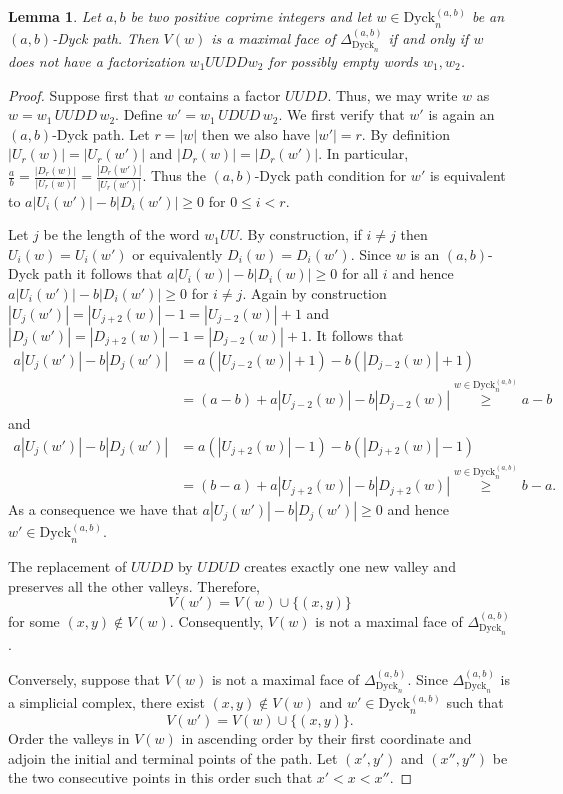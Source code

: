 \documentclass[11pt]{amsart}
\def\Dyck{\mathrm{Dyck}}
\theoremstyle{plain}
\newtheorem{lemma}{Lemma}
\numberwithin{lemma}{\DefaultNumberTheoremWithin}
\numberwithin{theorem}{\DefaultNumberTheoremWithin}
\numberwithin{corollary}{\DefaultNumberTheoremWithin}
\numberwithin{proposition}{\DefaultNumberTheoremWithin}
\numberwithin{conjecture}{\DefaultNumberTheoremWithin}
\theoremstyle{definition}
\numberwithin{definition}{\DefaultNumberTheoremWithin}
\numberwithin{question}{\DefaultNumberTheoremWithin}
\numberwithin{problem}{\DefaultNumberTheoremWithin}
\theoremstyle{remark}
\numberwithin{remark}{\DefaultNumberTheoremWithin}
\numberwithin{example}{\DefaultNumberTheoremWithin}
\numberwithin{claim}{\DefaultNumberTheoremWithin}
\begin{document}
\begin{lemma} \label{lem:max}
  Let $a,b$ be two positive coprime integers and let $w \in \Dyck_n^{(a,b)}$ be an $(a,b)$-Dyck path. Then $V(w)$ is a maximal face
  of $\Delta_{\Dyck_n}^{(a,b)}$ if and only if $w$ does not 
  have a factorization $w_1UUDDw_2$ for possibly empty
  words $w_1,w_2$. 
\end{lemma}

\begin{proof} 
Suppose first that $w$ contains a factor $UUDD$. 
Thus, we may write $w$ as $w=w_1\,UUDD\,w_2.$ Define $w'=w_1\,UDUD\,w_2.$  We first verify that $w'$ is again an $(a,b)$-Dyck path. Let $r = |w|$ then we also have $|w'| = r$. By definition 
$|U_r(w)| = |U_r(w')|$ and $|D_r(w)| = |D_r(w')|$. In particular, $\frac{a}{b} = \frac{|D_r(w)|}{|U_r(w)|} = \frac{|D_r(w')|}{|U_r(w')|}$. 
Thus the $(a,b)$-Dyck path condition for $w'$ is equivalent to $a|U_i(w')|-b|D_i(w')| \geq 0$
for $0 \leq i < r$. 

Let $j$ be the length of the word $w_1UU$. By
construction, if $i \neq j$ then $U_i(w) = U_i(w')$ or equivalently $D_i(w) = D_i(w')$. 
Since $w$ is an $(a,b)$-Dyck path it follows that $a|U_i(w)|-b|D_i(w)| \geq 0$
for all $i$
and hence $a|U_i(w')|-b|D_i(w')| \geq 0$ for $i \neq j$. 
Again by construction $|U_j(w')| = |U_{j+2}(w)|-1 = |U_{j-2}(w)|+1$
and $|D_j(w')| = |D_{j+2}(w)|-1 = |D_{j-2}(w)|+1$. It follows that
\begin{align*}
     a|U_j(w')|-b|D_j(w')| & = a(|U_{j-2}(w)|+1)-b(|D_{j-2}(w)|+1)  \\
     & = (a-b)
+ a|U_{j-2}(w)|-b|D_{j-2}(w)|  \overset{w \in \Dyck_n^ {(a,b)}}{\geq} a-b\end{align*}
and
\begin{align*} a|U_j(w')|-b|D_j(w')| & = a(|U_{j+2}(w)|-1)-b(|D_{j+2}(w)|-1) \\
& = (b-a)
+ a|U_{j+2}(w)|-b|D_{j+2}(w)| \overset{w \in \Dyck_n^ {(a,b)}}{\geq} b-a.\end{align*}
As a consequence we have that $a|U_j(w')|-b|D_j(w')| \geq 0$ and hence $w' \in \Dyck_n^ {(a,b)}$.

The replacement of $UUDD$ by $UDUD$ creates exactly one new valley and preserves all the other valleys. Therefore, \[ V(w')=V(w)\cup\{(x,y)\} \] for some $(x,y)\notin V(w)$. Consequently, 
$V(w)$ is not a maximal face of $\Delta_{\Dyck_n}^{(a,b)}$. 

Conversely, suppose that $V(w)$ is not a maximal face of $\Delta_{\Dyck_n}^{(a,b)}$. Since $\Delta_{\Dyck_n}^{(a,b)}$ is a simplicial complex, there exist $(x,y)\notin V(w)$ and $w'\in\Dyck_n^{(a,b)}$ such that \[ V(w')=V(w)\cup\{(x,y)\}. \] Order the valleys in $V(w)$ in ascending order by their 
first coordinate and adjoin the initial and terminal points of the path. Let $(x',y')$ and $(x'',y'')$ be the two consecutive points in this order such that $x' < x < x''$. 



\end{proof}
\end{document}
